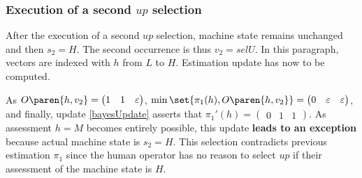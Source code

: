 \subsubsection{Execution of a second $up$ selection}
After the execution of a second $up$ selection, 
machine state remains unchanged and then $s_2 = H$. 
The second occurrence is thus $v_2  = selU$. 
In this paragraph, vectors are indexed 
with $h$ from $L$ to $H$. Estimation update has now
to be computed. 

As $O \paren{ h, v_2 } = \begin{pmatrix} 1 & 1 & \varepsilon \end{pmatrix}$, 
$\min \set{ \pi_1(h), O \paren{ h, v_2 } }  
= \begin{pmatrix} 0 & \varepsilon & \varepsilon \end{pmatrix} $,
and finally, update \ref{bayesUpdate} asserts that 
$\pi_1'(h) = \begin{pmatrix} 0 & 1 & 1  \end{pmatrix}$.
As assessment $h=M$ becomes entirely possible, 
this update \textbf{leads to an exception} because actual
machine state is $s_2=H$.  
This selection contradicts previous estimation $\pi_1$ 
since the human operator has no reason to select $up$
if their assessment of the machine state is $H$. 

